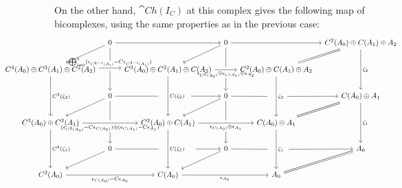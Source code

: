 On the other hand, $\cat{Ch}(I_C)$ at this complex gives the following map of bicomplexes, using the same properties as in the previous case:
\[\hspace{-70pt}\begin{tikzcd}[column sep=8pt]
	& 0 && 0 && {C^2(A_0)\oplus C(A_1)\oplus A_2} \\
	{C^4(A_0)\oplus C^3(A_1)\oplus C^2(A_2)} && {C^3(A_0)\oplus C^2(A_1)\oplus C(A_2)} && {C^2(A_0)\oplus C(A_1)\oplus A_2} \\
	& 0 && 0 && {C(A_0)\oplus A_1} \\
	{C^3(A_0)\oplus C^2(A_1)} && {C^2(A_0)\oplus C(A_1)} && {C(A_0)\oplus A_1} \\
	& 0 && 0 && {A_0} \\
	{C^2(A_0)} && {C(A_0)} && {A_0}
	\arrow["{\zeta_2}", from=1-6, to=3-6]
	\arrow["{\zeta_1}", from=3-6, to=5-6]
	\arrow["{\epsilon_{C(A_0)}-C\epsilon_{A_0}}"', from=6-1, to=6-3]
	\arrow["{\epsilon_{A_0}}"', from=6-3, to=6-5]
	\arrow[Rightarrow, no head, from=5-6, to=6-5]
	\arrow[""{name=0, anchor=center, inner sep=0}, "{(\epsilon_{C^2(A_0)}-C\epsilon_{C(A_0)})\oplus (\epsilon_{C(A_1)}-C\epsilon_{A_1})}"', from=4-1, to=4-3]
	\arrow[""{name=1, anchor=center, inner sep=0}, "{\epsilon_{C(A_0)}\oplus \epsilon_{A_1}}"', from=4-3, to=4-5]
	\arrow[from=1-2, to=1-4]
	\arrow[from=1-4, to=1-6]
	\arrow[Rightarrow, no head, from=1-6, to=2-5]
	\arrow[Rightarrow, no head, from=3-6, to=4-5]
	\arrow[from=1-4, to=2-3]
	\arrow[from=1-2, to=2-1]
	\arrow[""{name=2, anchor=center, inner sep=0}, "{\epsilon_{C^2(A_0)}\oplus \epsilon_{C(A_1)}\oplus \epsilon_{A_2}}"', from=2-3, to=2-5]
	\arrow[""{name=3, anchor=center, inner sep=0}, "{\bigoplus_{i=0}^3(\epsilon_{C^{4-i}(A_i)}-C\epsilon_{C^{3-i}(A_i)})}", shift left, from=2-1, to=2-3]
	\arrow[""{name=4, anchor=center, inner sep=0}, "{\zeta_1}", from=4-5, to=6-5]
	\arrow[""{name=5, anchor=center, inner sep=0}, "{\zeta_2}", from=2-5, to=4-5]
	\arrow[""{name=6, anchor=center, inner sep=0}, "{C(\zeta_1)}", from=4-3, to=6-3]
	\arrow[""{name=7, anchor=center, inner sep=0}, "{C(\zeta_2)}", from=2-3, to=4-3]
	\arrow["{C^2(\zeta_2)}", from=2-1, to=4-1]
	\arrow["{C^2(\zeta_1)}", from=4-1, to=6-1]
	\arrow[from=5-2, to=6-1]
	\arrow[from=3-2, to=4-1]
	\arrow[from=3-4, to=4-3]
	\arrow[from=5-4, to=6-3]
	\arrow[shorten >=9pt, no head, from=1-2, to=3]
	\arrow[shorten <=3pt, from=3, to=3-2]
	\arrow[shorten >=3pt, no head, from=3-2, to=0]
	\arrow[shorten <=11pt, from=0, to=5-2]
	\arrow[shorten >=12pt, no head, from=5-2, to=6]
	\arrow[shorten <=36pt, from=6, to=5-4]
	\arrow[shorten >=11pt, no head, from=5-4, to=4]
	\arrow[shorten <=16pt, from=4, to=5-6]
	\arrow[shorten <=14pt, from=5, to=3-6]
	\arrow[shorten >=11pt, no head, from=3-4, to=5]
	\arrow[shorten <=30pt, from=7, to=3-4]
	\arrow[shorten >=12pt, no head, from=3-2, to=7]
	\arrow[shorten >=3pt, no head, from=1-4, to=2]
	\arrow[shorten <=10pt, from=2, to=3-4]
	\arrow[shorten >=3pt, no head, from=3-4, to=1]
	\arrow[shorten <=11pt, from=1, to=5-4]
\end{tikzcd}\]

